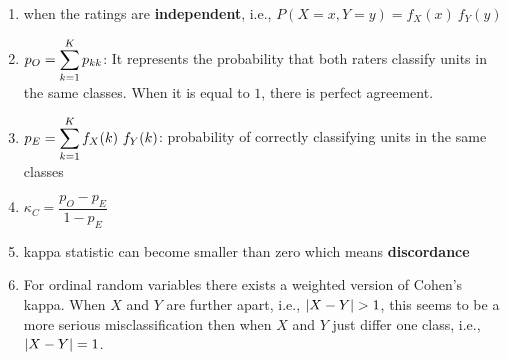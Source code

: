 \begin{enumerate}
    \item when the ratings are \textbf{independent}, i.e., $P(X = x, Y = y) = f_X (x)\ f_Y (y)$
    \hfill \cite{statistics/book/Statistics-for-Data-Scientists/Maurits-Kaptein}

    \item $p_O = \displaystyle\sum^K_{k=1} p_{kk}$: It represents the probability that both raters classify units in the same classes. 
    When it is equal to $1$, there is perfect agreement. 
    \hfill \cite{statistics/book/Statistics-for-Data-Scientists/Maurits-Kaptein}

    \item $p_E = \displaystyle\sum^K_{k=1} f_X (k)\ f_Y (k)$: probability of correctly classifying units in the same classes
    \hfill \cite{statistics/book/Statistics-for-Data-Scientists/Maurits-Kaptein}

    \item $\kappa_C = \dfrac{p_O - p_E}{1 - p_E}$
    \hfill \cite{statistics/book/Statistics-for-Data-Scientists/Maurits-Kaptein}

    \item kappa statistic can become smaller than zero which means \textbf{discordance}
    \hfill \cite{statistics/book/Statistics-for-Data-Scientists/Maurits-Kaptein}

    \item For ordinal random variables there exists a weighted version of Cohen’s kappa. 
    When $X$ and $Y$ are further apart, i.e., $\left| X - Y \right| > 1$, this seems to be a more serious misclassification then when $X$ and $Y$ just differ one class, i.e., $\left| X - Y \right| = 1$.
    \hfill \cite{statistics/book/Statistics-for-Data-Scientists/Maurits-Kaptein}
\end{enumerate}



